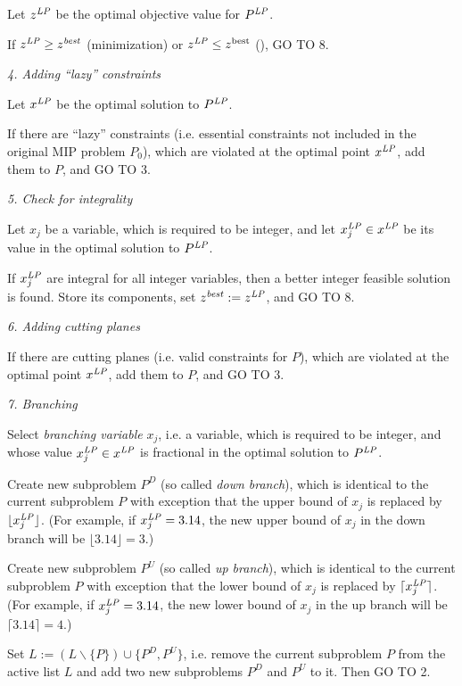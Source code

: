 Let $z^{\it LP}$ be the optimal objective value for $P^{\it LP}$.

If $z^{\it LP}\geq z^{\it best}$ (minimization) or
$z^{\it LP}\leq z^{\rm best}$ (), GO TO 8.

{\it 4. Adding ``lazy'' constraints}

Let $x^{\it LP}$ be the optimal solution to $P^{\it LP}$.

If there are ``lazy'' constraints (i.e. essential constraints not
included in the original MIP problem $P_0$), which are violated at the
optimal point $x^{\it LP}$, add them to $P$, and GO TO 3.

{\it 5. Check for integrality}

Let $x_j$ be a variable, which is required to be integer, and let
$x^{\it LP}_j\in x^{\it LP}$ be its value in the optimal solution to
$P^{\it LP}$.

If $x^{\it LP}_j$ are integral for all integer variables, then a better
integer feasible solution is found. Store its components, set
$z^{\it best}:=z^{\it LP}$, and GO TO 8.

{\it 6. Adding cutting planes}

If there are cutting planes (i.e. valid constraints for $P$),
which are violated at the optimal point $x^{\it LP}$, add them to $P$,
and GO TO 3.

{\it 7. Branching}

Select {\it branching variable} $x_j$, i.e. a variable, which is
required to be integer, and whose value $x^{\it LP}_j\in x^{\it LP}$ is
fractional in the optimal solution to $P^{\it LP}$.

Create new subproblem $P^D$ (so called {\it down branch}), which is
identical to the current subproblem $P$ with exception that the upper
bound of $x_j$ is replaced by $\lfloor x^{\it LP}_j\rfloor$. (For
example, if $x^{\it LP}_j=3.14$, the new upper bound of $x_j$ in the
down branch will be $\lfloor 3.14\rfloor=3$.)

Create new subproblem $P^U$ (so called {\it up branch}), which is
identical to the current subproblem $P$ with exception that the lower
bound of $x_j$ is replaced by $\lceil x^{\it LP}_j\rceil$. (For example,
if $x^{\it LP}_j=3.14$, the new lower bound of $x_j$ in the up branch
will be $\lceil 3.14\rceil=4$.)

Set $L:=(L\backslash\{P\})\cup\{P^D,P^U\}$, i.e. remove the current
subproblem $P$ from the active list $L$ and add two new subproblems
$P^D$ and $P^U$ to it. Then GO TO 2.

